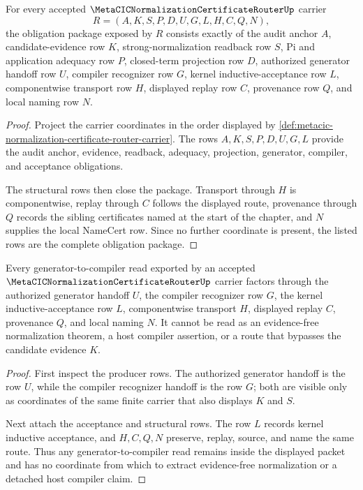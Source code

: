 \begin{theorem}
\label{thm:metacic-normalization-certificate-router-obligation-closure-package}
For every accepted $\MetaCICNormalizationCertificateRouterUp$ carrier
$$
R=(A,K,S,P,D,U,G,L,H,C,Q,N),
$$
the obligation package exposed by $R$ consists exactly of the audit anchor $A$, candidate-evidence row $K$, strong-normalization readback row $S$, Pi and application adequacy row $P$, closed-term projection row $D$, authorized generator handoff row $U$, compiler recognizer row $G$, kernel inductive-acceptance row $L$, componentwise transport row $H$, displayed replay row $C$, provenance row $Q$, and local naming row $N$.
\end{theorem}
\begin{proof}
Project the carrier coordinates in the order displayed by \autoref{def:metacic-normalization-certificate-router-carrier}. The rows $A,K,S,P,D,U,G,L$ provide the audit anchor, evidence, readback, adequacy, projection, generator, compiler, and acceptance obligations.

The structural rows then close the package. Transport through $H$ is componentwise, replay through $C$ follows the displayed route, provenance through $Q$ records the sibling certificates named at the start of the chapter, and $N$ supplies the local NameCert row. Since no further coordinate is present, the listed rows are the complete obligation package.
\end{proof}

\begin{theorem}
\label{thm:metacic-normalization-certificate-router-generator-compiler-route}
Every generator-to-compiler read exported by an accepted $\MetaCICNormalizationCertificateRouterUp$ carrier factors through the authorized generator handoff $U$, the compiler recognizer row $G$, the kernel inductive-acceptance row $L$, componentwise transport $H$, displayed replay $C$, provenance $Q$, and local naming $N$. It cannot be read as an evidence-free normalization theorem, a host compiler assertion, or a route that bypasses the candidate evidence $K$.
\end{theorem}
\begin{proof}
First inspect the producer rows. The authorized generator handoff is the row $U$, while the compiler recognizer handoff is the row $G$; both are visible only as coordinates of the same finite carrier that also displays $K$ and $S$.

Next attach the acceptance and structural rows. The row $L$ records kernel inductive acceptance, and $H,C,Q,N$ preserve, replay, source, and name the same route. Thus any generator-to-compiler read remains inside the displayed packet and has no coordinate from which to extract evidence-free normalization or a detached host compiler claim.
\end{proof}

